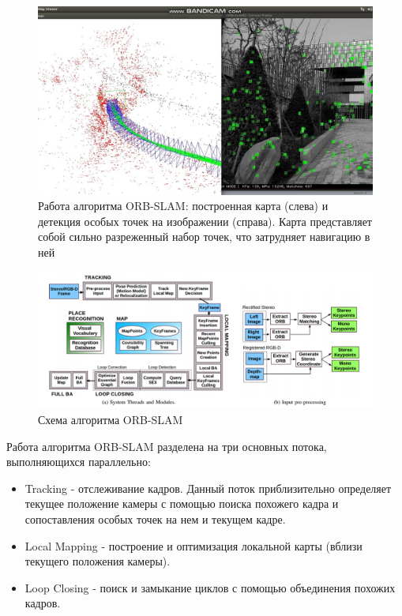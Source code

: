\documentclass{mipt-thesis-ms}
\begin{document}
	\begin{figure}
		\includegraphics[width=1.0\textwidth]{img/orb_slam_map.jpg}
		\caption{Работа алгоритма ORB-SLAM: построенная карта (слева) и детекция особых точек на изображении (справа). Карта представляет собой сильно разреженный набор точек, что затрудняет навигацию в ней}
		\label{figure_orb_slam_map}
	\end{figure}

	\begin{figure}
		\includegraphics[width=1.0\textwidth]{img/orb_slam_scheme_high_resolution.png}
		\caption{Схема алгоритма ORB-SLAM}
		\label{figure_orb_slam}
	\end{figure}
	
	Работа алгоритма ORB-SLAM разделена на три основных потока, выполняющихся параллельно:
	
	\begin{itemize}
		\item Tracking - отслеживание кадров. Данный поток приблизительно определяет текущее положение камеры с помощью поиска похожего кадра и сопоставления особых точек на нем и текущем кадре.
		\item Local Mapping - построение и оптимизация локальной карты (вблизи текущего положения камеры).
		\item Loop Closing - поиск и замыкание циклов с помощью объединения похожих кадров.
	\end{itemize}
\end{document}
